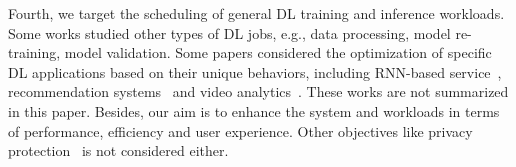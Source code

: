 Fourth, we target the scheduling of general DL training and inference workloads. Some works studied other types of DL jobs, e.g., data processing, model re-training, model validation. Some papers considered the optimization of specific DL applications based on their unique behaviors, including RNN-based service~\cite{gao2018low,holmes2019grnn}, recommendation systems~\cite{gupta2020deeprecsys, liu2021jizhi,jiang2021MicroRec,jiang2021FleetRec} and video analytics~\cite{shen2019nexus,zhang2020hysia}. These works are not summarized in this paper. Besides, our aim is to enhance the system and workloads in terms of performance, efficiency and user experience. Other objectives like privacy protection~\cite{DPF,Sage} is not considered either.




























